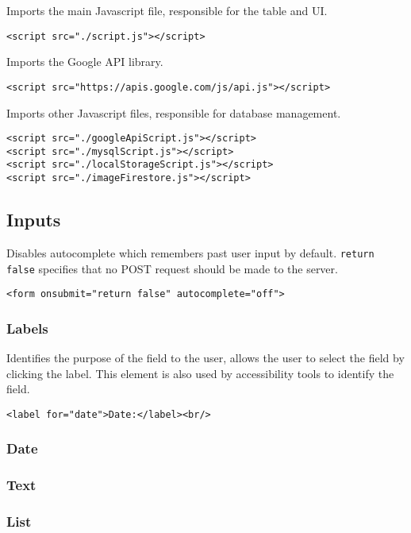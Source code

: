 \documentclass[letterpaper]{article}
\begin{document}
Imports the main Javascript file, responsible for the table and UI.
\begin{lstlisting}[firstnumber=7]
<script src="./script.js"></script>
\end{lstlisting}

Imports the Google API library.
\begin{lstlisting}[firstnumber=8]
<script src="https://apis.google.com/js/api.js"></script>
\end{lstlisting}

Imports other Javascript files, responsible for database management.
\begin{lstlisting}[firstnumber=9]
<script src="./googleApiScript.js"></script>
<script src="./mysqlScript.js"></script>
<script src="./localStorageScript.js"></script>
<script src="./imageFirestore.js"></script>
\end{lstlisting}

\subsection{Inputs}

Disables autocomplete which remembers past user input by default. \lstinline{return false} specifies that no POST request should be made to the server.
\begin{lstlisting}[firstnumber=20]
<form onsubmit="return false" autocomplete="off">
\end{lstlisting}

\subsubsection{Labels}

Identifies the purpose of the field to the user, allows the user to select the field by clicking the label.
This element is also used by accessibility tools to identify the field.
\begin{lstlisting}[firstnumber=22]
<label for="date">Date:</label><br/>
\end{lstlisting}

\subsubsection{Date}
\subsubsection{Text}
\subsubsection{List}
\end{document}
